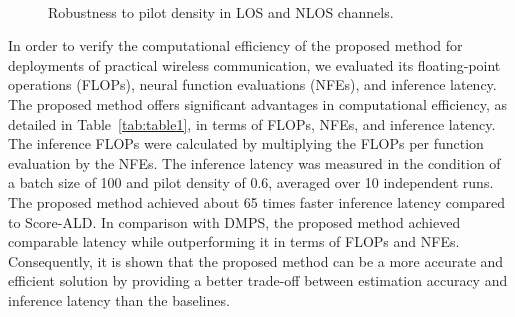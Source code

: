 \documentclass[lettersize,journal]{IEEEtran}
\begin{document}
\begin{figure}[!t]
\\
\caption{Robustness to pilot density in LOS and NLOS channels.}
\label{fig_sim_2}
\end{figure}

In order to verify the computational efficiency of the proposed method for deployments of practical wireless communication, we evaluated its floating-point operations (FLOPs), neural function evaluations (NFEs), and inference latency. The proposed method offers significant advantages in computational efficiency, as detailed in Table~\ref{tab:table1}, in terms of FLOPs, NFEs, and inference latency. The inference FLOPs were calculated by multiplying the FLOPs per function evaluation by the NFEs. The inference latency was measured in the condition of a batch size of 100 and pilot density of 0.6, averaged over 10 independent runs. The proposed method achieved about 65 times faster inference latency compared to Score-ALD. In comparison with DMPS, the proposed method achieved comparable latency while outperforming it in terms of FLOPs and NFEs. Consequently, it is shown that the proposed method can be a more accurate and efficient solution by providing a better trade-off between estimation accuracy and inference latency than the baselines.
\end{document}
